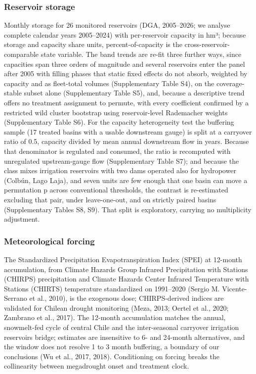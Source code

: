 \documentclass[
]{agujournal2019}
\begin{document}
\subsubsection{Reservoir storage}\label{reservoir-storage}

Monthly storage for 26 monitored reservoirs (DGA, 2005--2026; we analyse
complete calendar years 2005--2024) with per-reservoir capacity in hm³;
because storage and capacity share units, percent-of-capacity is the
cross-reservoir-comparable state variable. The band trends are re-fit
three further ways, since capacities span three orders of magnitude and
several reservoirs enter the panel after 2005 with filling phases that
static fixed effects do not absorb, weighted by capacity and as
fleet-total volumes (Supplementary Table S4), on the coverage-stable
subset alone (Supplementary Table S5), and, because a descriptive trend
offers no treatment assignment to permute, with every coefficient
confirmed by a restricted wild cluster bootstrap using reservoir-level
Rademacher weights (Supplementary Table S6). For the capacity
heterogeneity test the buffering sample (17 treated basins with a usable
downstream gauge) is split at a carryover ratio of 0.5, capacity divided
by mean annual downstream flow in years. Because that denominator is
regulated and consumed, the ratio is recomputed with unregulated
upstream-gauge flow (Supplementary Table S7); and because the class
mixes irrigation reservoirs with two dams operated also for hydropower
(Colbún, Lago Laja), and seven units are few enough that one basin can
move a permutation p across conventional thresholds, the contrast is
re-estimated excluding that pair, under leave-one-out, and on strictly
paired basins (Supplementary Tables S8, S9). That split is exploratory,
carrying no multiplicity adjustment.

\subsubsection{Meteorological forcing}\label{meteorological-forcing}

The Standardized Precipitation Evapotranspiration Index (SPEI) at
12-month accumulation, from Climate Hazards Group Infrared Precipitation
with Stations (CHIRPS) precipitation and Climate Hazards Center Infrared
Temperature with Stations (CHIRTS) temperature standardized on
1991--2020 (Sergio M. Vicente-Serrano et al., 2010), is the exogenous
dose; CHIRPS-derived indices are validated for Chilean drought
monitoring (Meza, 2013; Oertel et al., 2020; Zambrano et al., 2017). The
12-month accumulation matches the annual, snowmelt-fed cycle of central
Chile and the inter-seasonal carryover irrigation reservoirs bridge;
estimates are insensitive to 6- and 24-month alternatives, and the
window does not resolve 1 to 3 month buffering, a boundary of our
conclusions (Wu et al., 2017, 2018). Conditioning on forcing breaks the
collinearity between megadrought onset and treatment clock.
\end{document}
